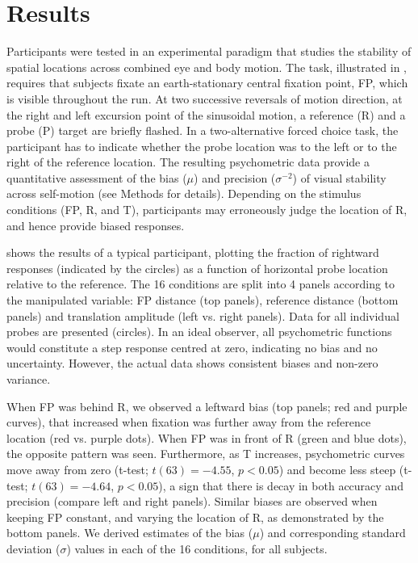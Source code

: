 \section{Results}

Participants were tested in an experimental paradigm that studies the stability of spatial locations across combined eye and body motion. The task, illustrated in , requires that subjects fixate an earth-stationary central fixation point, FP, which is visible throughout the run. At two successive reversals of motion direction, at the right and left excursion point of the sinusoidal motion, a reference (R) and a probe (P) target are briefly flashed. In a two-alternative forced choice task, the participant has to indicate whether the probe location was to the left or to the right of the reference location. The resulting psychometric data provide a quantitative assessment of the bias ($\mu$) and precision ($\sigma^{-2}$) of visual stability across self-motion (see Methods for details). Depending on the stimulus conditions (FP, R, and T), participants may erroneously judge the location of R, and hence provide biased responses.

 shows the results of a typical participant, plotting the fraction of rightward responses (indicated by the circles) as a function of horizontal probe location relative to the reference. The 16 conditions are split into 4 panels according to the manipulated variable: FP distance (top panels), reference distance (bottom panels) and translation amplitude (left vs. right panels). Data for all individual probes are presented (circles). In an ideal observer, all psychometric functions would constitute a step response centred at zero, indicating no bias and no uncertainty. However, the actual data shows consistent biases and non-zero variance.

When FP was behind R, we observed a leftward bias (top panels; red and purple curves), that increased when fixation was further away from the reference location (red vs. purple dots). When FP was in front of R (green and blue dots), the opposite pattern was seen. Furthermore, as T increases, psychometric curves move away from zero (t-test; $t(63) = -4.55$, $p < 0.05$) and become less steep (t-test; $t(63) = -4.64$, $p < 0.05$), a sign that there is decay in both accuracy and precision (compare left and right panels). Similar biases are observed when keeping FP constant, and varying the location of R, as demonstrated by the bottom panels. We derived estimates of the bias ($\mu$) and corresponding standard deviation ($\sigma$) values in each of the 16 conditions, for all subjects.

